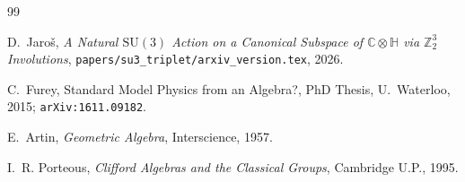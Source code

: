 \documentclass[12pt,a4paper]{article}
\theoremstyle{remark}
\begin{document}
\begin{thebibliography}{99}

D.~Jaro\v{s},
\emph{A Natural $\mathrm{SU}(3)$ Action on a Canonical Subspace of
$\mathbb{C}\otimes\mathbb{H}$ via $\mathbb{Z}_2^3$ Involutions},
\texttt{papers/su3\_triplet/arxiv\_version.tex}, 2026.

C.~Furey,
Standard Model Physics from an Algebra?,
PhD Thesis, U.~Waterloo, 2015; \texttt{arXiv:1611.09182}.

E.~Artin,
\emph{Geometric Algebra}, Interscience, 1957.

I.~R. Porteous,
\emph{Clifford Algebras and the Classical Groups}, Cambridge U.P., 1995.

\end{thebibliography}
\end{document}
